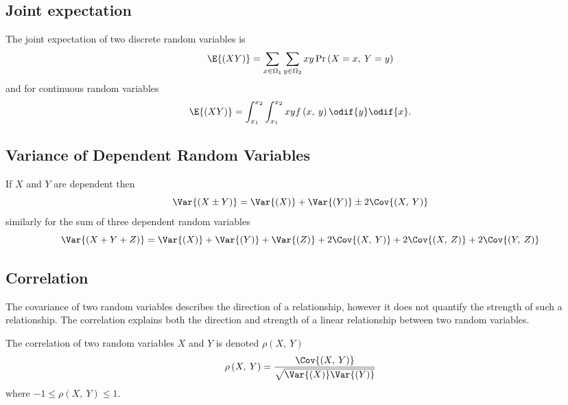 \documentclass{article}
\begin{document}
\begin{multicols}{3}
    \subsection{Joint expectation}
    The joint expectation of two discrete random variables is
    \begin{equation*}
        \E{\left( XY \right)} = \sum_{x\in\Omega_1} \sum_{y\in\Omega_2} xy \Pr{\left( X = x,\: Y = y \right)}
    \end{equation*}
    and for continuous random variables
    \begin{equation*}
        \E{\left( XY \right)} = \int_{x_1}^{x_2} \int_{x_1}^{x_2} xy f\left( x,\: y \right) \odif{y} \odif{x}.
    \end{equation*}
    \subsection{Variance of Dependent Random Variables}
    If \(X\) and \(Y\) are dependent then
    \begin{equation*}
        \Var{\left( X \pm Y \right)} = \Var{\left( X \right)} + \Var{\left( Y \right)} \pm 2\Cov{\left( X,\: Y \right)}
    \end{equation*}
    similarly for the sum of three dependent random variables
    \begin{equation*}
        \Var{\left( X + Y + Z \right)} = \Var{\left( X \right)} + \Var{\left( Y \right)} + \Var{\left( Z \right)} + 2\Cov{\left( X,\: Y \right)} + 2\Cov{\left( X,\: Z \right)} + 2\Cov{\left( Y,\: Z \right)}
    \end{equation*}
    \subsection{Correlation}
    The covariance of two random variables describes the direction of a relationship, however
    it does not quantify the strength of such a relationship. The correlation explains both
    the direction and strength of a linear relationship between two random variables.

    The correlation of two random variables \(X\) and \(Y\) is denoted \(\rho\left( X,\: Y \right)\)
    \begin{equation*}
        \rho\left( X,\: Y \right) = \frac{\Cov{\left( X,\: Y \right)}}{\sqrt{\Var{\left( X \right)} \Var{\left( Y \right)}}}
    \end{equation*}
    where \(-1 \leq \rho\left( X,\: Y \right) \leq 1\).


\end{multicols}
\end{document}

